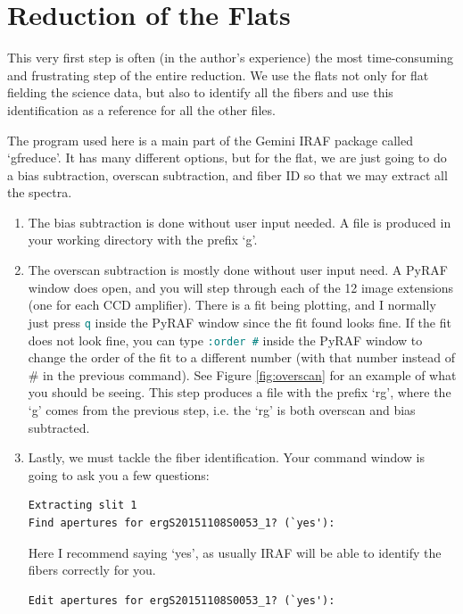 \documentclass[12pt]{report}
\newcommand{\ty}[1]{\textcolor{teal}{\texttt{#1}}}
\begin{document}
\section{Reduction of the Flats}

This very first step is often (in the author's experience) the most time-consuming and frustrating step of the entire reduction. We use the flats not only for flat fielding the science data, but also to identify all the fibers and use this identification as a reference for all the other files.

The program used here is a main part of the Gemini IRAF package called `gfreduce'. It has many different options, but for the flat, we are just going to do a bias subtraction, overscan subtraction, and fiber ID so that we may extract all the spectra.

\begin{enumerate}
\item The bias subtraction is done without user input needed. A file is produced in your working directory with the prefix `g'.
\item The overscan subtraction is mostly done without user input need. A PyRAF window does open, and you will step through each of the 12 image extensions (one for each CCD amplifier). There is a fit being plotting, and I normally just press \ty{q} inside the PyRAF window since the fit found looks fine. If the fit does not look fine, you can type \ty{:order \#} inside the PyRAF window to change the order of the fit to a different number (with that number instead of \# in the previous command). See Figure \ref{fig:overscan} for an example of what you should be seeing. This step produces a file with the prefix `rg', where the `g' comes from the previous step, i.e. the `rg' is both overscan and bias subtracted.
\item Lastly, we must tackle the fiber identification. Your command window is going to ask you a few questions:
\begin{verbatim}
Extracting slit 1
Find apertures for ergS20151108S0053_1? (`yes'): 
\end{verbatim}
Here I recommend saying `yes', as usually IRAF will be able to identify the fibers correctly for you. 
\begin{verbatim}
Edit apertures for ergS20151108S0053_1? (`yes'): 
\end{verbatim}

\end{enumerate}
\end{document}
